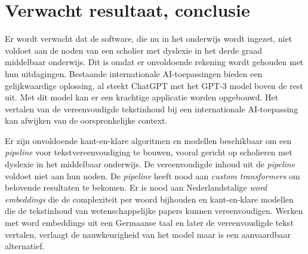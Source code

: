 \section{Verwacht resultaat, conclusie}
\label{sec:verwachte_resultaten}

Er wordt verwacht dat de software, die nu in het onderwijs wordt ingezet, niet voldoet aan de noden van een scholier met dyslexie in het derde graad middelbaar onderwijs. Dit is omdat er onvoldoende rekening wordt gehouden met hun uitdagingen. Bestaande internationale AI-toepassingen bieden een gelijkwaardige oplossing, al steekt ChatGPT met het GPT-3 model boven de rest uit. Met dit model kan er een krachtige applicatie worden opgebouwd. Het vertalen van de vereenvoudigde tekstinhoud bij een internationale AI-toepassing kan afwijken van de oorspronkelijke context.

Er zijn onvoldoende kant-en-klare algoritmen en modellen beschikbaar om een \textit{pipeline} voor tekstvereenvoudiging te bouwen, vooral gericht op scholieren met dyslexie in het middelbaar onderwijs. De vereenvoudigde inhoud uit de \textit{pipeline} voldoet niet aan hun noden. De \textit{pipeline} heeft nood aan \textit{custom transformers} om belovende resultaten te bekomen. Er is nood aan Nederlandstalige \textit{word embeddings} die de complexiteit per woord bijhouden en kant-en-klare modellen die de tekstinhoud van wetenschappelijke papers kunnen vereenvoudigen. Werken met word embeddings uit een Germaanse taal en later de vereenvoudigde tekst vertalen, verlaagt de nauwkeurigheid van het model maar is een aanvaardbaar alternatief.